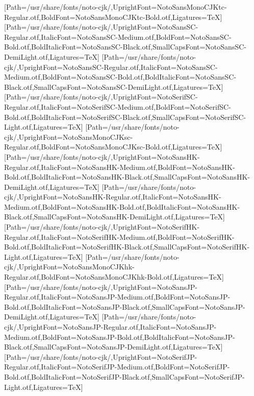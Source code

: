 \newfontfamily{}[Path=/usr/share/fonts/noto-cjk/,UprightFont=NotoSansMonoCJKtc-Regular.otf,BoldFont=NotoSansMonoCJKtc-Bold.otf,Ligatures=TeX]
\newfontfamily{}[Path=/usr/share/fonts/noto-cjk/,UprightFont=NotoSansSC-Regular.otf,ItalicFont=NotoSansSC-Medium.otf,BoldFont=NotoSansSC-Bold.otf,BoldItalicFont=NotoSansSC-Black.otf,SmallCapsFont=NotoSansSC-DemiLight.otf,Ligatures=TeX]
\newfontfamily{}[Path=/usr/share/fonts/noto-cjk/,UprightFont=NotoSansSC-Regular.otf,ItalicFont=NotoSansSC-Medium.otf,BoldFont=NotoSansSC-Bold.otf,BoldItalicFont=NotoSansSC-Black.otf,SmallCapsFont=NotoSansSC-DemiLight.otf,Ligatures=TeX]
\newfontfamily{}[Path=/usr/share/fonts/noto-cjk/,UprightFont=NotoSerifSC-Regular.otf,ItalicFont=NotoSerifSC-Medium.otf,BoldFont=NotoSerifSC-Bold.otf,BoldItalicFont=NotoSerifSC-Black.otf,SmallCapsFont=NotoSerifSC-Light.otf,Ligatures=TeX]
\newfontfamily{}[Path=/usr/share/fonts/noto-cjk/,UprightFont=NotoSansMonoCJKsc-Regular.otf,BoldFont=NotoSansMonoCJKsc-Bold.otf,Ligatures=TeX]
\newfontfamily{}[Path=/usr/share/fonts/noto-cjk/,UprightFont=NotoSansHK-Regular.otf,ItalicFont=NotoSansHK-Medium.otf,BoldFont=NotoSansHK-Bold.otf,BoldItalicFont=NotoSansHK-Black.otf,SmallCapsFont=NotoSansHK-DemiLight.otf,Ligatures=TeX]
\newfontfamily{}[Path=/usr/share/fonts/noto-cjk/,UprightFont=NotoSansHK-Regular.otf,ItalicFont=NotoSansHK-Medium.otf,BoldFont=NotoSansHK-Bold.otf,BoldItalicFont=NotoSansHK-Black.otf,SmallCapsFont=NotoSansHK-DemiLight.otf,Ligatures=TeX]
\newfontfamily{}[Path=/usr/share/fonts/noto-cjk/,UprightFont=NotoSerifHK-Regular.otf,ItalicFont=NotoSerifHK-Medium.otf,BoldFont=NotoSerifHK-Bold.otf,BoldItalicFont=NotoSerifHK-Black.otf,SmallCapsFont=NotoSerifHK-Light.otf,Ligatures=TeX]
\newfontfamily{}[Path=/usr/share/fonts/noto-cjk/,UprightFont=NotoSansMonoCJKhk-Regular.otf,BoldFont=NotoSansMonoCJKhk-Bold.otf,Ligatures=TeX]
\newfontfamily{}[Path=/usr/share/fonts/noto-cjk/,UprightFont=NotoSansJP-Regular.otf,ItalicFont=NotoSansJP-Medium.otf,BoldFont=NotoSansJP-Bold.otf,BoldItalicFont=NotoSansJP-Black.otf,SmallCapsFont=NotoSansJP-DemiLight.otf,Ligatures=TeX]
\newfontfamily{}[Path=/usr/share/fonts/noto-cjk/,UprightFont=NotoSansJP-Regular.otf,ItalicFont=NotoSansJP-Medium.otf,BoldFont=NotoSansJP-Bold.otf,BoldItalicFont=NotoSansJP-Black.otf,SmallCapsFont=NotoSansJP-DemiLight.otf,Ligatures=TeX]
\newfontfamily{}[Path=/usr/share/fonts/noto-cjk/,UprightFont=NotoSerifJP-Regular.otf,ItalicFont=NotoSerifJP-Medium.otf,BoldFont=NotoSerifJP-Bold.otf,BoldItalicFont=NotoSerifJP-Black.otf,SmallCapsFont=NotoSerifJP-Light.otf,Ligatures=TeX]
